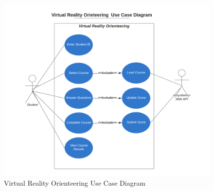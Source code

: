 \begin{figure}[h]
	\centering
	\includegraphics[width=.9\textwidth]{Requirements/assets/vr-use-case-diagram.png}
	\caption[Virutal Reality Orienteering Use Case Diagram]{\label{Virutal Reality Orienteering Use Case Diagram}Virtual Reality Orienteering Use Case Diagram}
\end{figure}

